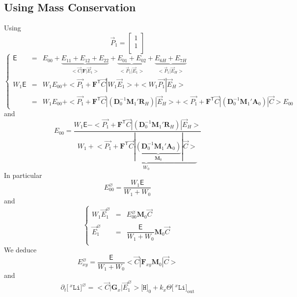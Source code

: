 \documentclass[aps,onecolumn,11pt]{revtex4}
\newcommand{\mychem}[1]{\mathtt{#1}}
\newcommand{\myconc}[1]{\big[#1\big]}
\newcommand{\spLi}[1]{{\!~^{#1}\mychem{Li}}}
\newcommand{\Li}[1]{\myconc{\spLi{#1}}}
\newcommand{\spproton}{\mychem{H}}
\newcommand{\proton}{\myconc{\spproton}}
\newcommand{\myout}[1]{{#1}_{\mathrm{out}}}
\newcommand{\mytrn}[1]{{#1}^{\!\mathsf{T}}}
\newcommand{\mymat}[1]{{\bm{#1}}}
\begin{document}
\subsection{Using Mass Conservation}
Using $$\vec{P}_1=\begin{bmatrix}1\\1\\\end{bmatrix}$$
\begin{equation}
\left\lbrace
\begin{array}{rcl}
\mathsf{E}    & = & E_{00} 
+ \underbrace{E_{11}+E_{12}+E_{22}}_{<\vec{C}|\mymat{F}|\vec{E}_1>} 
+ \underbrace{E_{01}+E_{02}}_{<\vec{P}_1|\vec{E}_1>} 
+ \underbrace{E_{6H} + E_{7H}}_{<\vec{P}_1|\vec{E}_H>}\\
W_1\mathsf{E} & = & W_1E_{00} + <\vec{P_1} + \mytrn{\mymat{F}} \vec{C} | W_1 \vec{E}_1 > +  < W_1\vec{P_1} | \vec{E}_H>\\
     & = &  W_1E_{00} + <\vec{P_1} + \mytrn{\mymat{F}} \vec{C}| \left( \mymat{D}_0^{-1} \mymat{M}_1' \mymat{R}_H \right) | \vec{E}_H> + 
     <\vec{P_1} + \mytrn{\mymat{F}} \vec{C}| \left( \mymat{D}_0^{-1} \mymat{M}_1' \mymat{A}_0 \right) | \vec{C}> E_{00}
\end{array}
\right.
\end{equation}
and
\begin{equation}
\boxed{
	E_{00} = \dfrac{W_1 \mathsf{E} - <\vec{P_1} + \mytrn{\mymat{F}} \vec{C}| \left( \mymat{D}_0^{-1} \mymat{M}_1' \mymat{R}_H \right) | \vec{E}_H> }
	{ W_1+\underbrace{<\vec{P_1} + \mytrn{\mymat{F}} \vec{C}| \underbrace{\left( \mymat{D}_0^{-1} \mymat{M}_1' \mymat{A}_0 \right)}_{\mymat{M}_0} | \vec{C}>}_{W_0}}
}
\end{equation}
In particular
\begin{equation}
	E_{00}^\varnothing = \dfrac{W_1 \mathsf{E}}{W_1+W_0}
\end{equation}
and
\begin{equation}
\left\lbrace
\begin{array}{rcl}
	W_1 \vec{E}_1^\varnothing & = & E_{00}^\varnothing  \mymat{M}_0 \vec{C}\\
	\\
	\vec{E}_1^\varnothing     & = & \dfrac{\mathsf{E}}{W_1+W_0}\mymat{M}_0 \vec{C}\\
\end{array}
\right.
\end{equation}
We deduce
\begin{equation}
	E_{xy}^\varnothing = \dfrac{\mathsf{E}}{W_1+W_0} <\vec{C}|\mymat{F}_{xy}\mymat{M}_0|\vec{C}>
\end{equation}
and
\begin{equation}
	\partial_t \Li{x}^\varnothing = <\vec{C}|\mymat{G}_x|\vec{E}_1^\varnothing> \proton_0 + k_x \Theta \myout{\Li{x}}
\end{equation}
\end{document}
